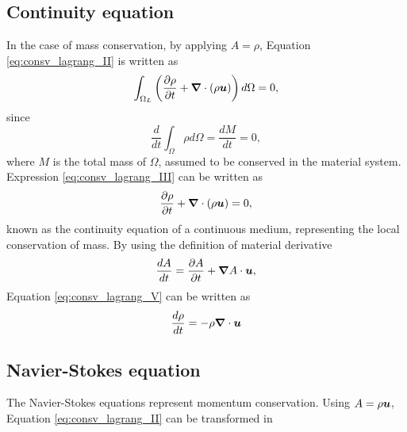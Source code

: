 \subsection{Continuity equation}
\label{subsec:continuity_eq}


In the case of mass conservation, by applying $A=\rho$, Equation \eqref{eq:consv_lagrang_II} is written as
%
	\begin{equation} \label{eq:consv_lagrang_III}
		\int_{\Omega_L} \left( \frac{\partial \rho}{\partial t} + \boldsymbol{\nabla}  \cdot(\rho \boldsymbol{u}) \right) d\Omega = 0,
	\end{equation}
%
since 
%
	\begin{equation} \label{eq:consv_lagrang_IV}
		\frac{d}{dt}\int_\Omega \rho d\Omega = \frac{dM}{dt} = 0,
	\end{equation}
%
where $M$ is the total mass of $\Omega$, assumed to be conserved in the material system. Expression \eqref{eq:consv_lagrang_III} can be written as 
%
	\begin{equation} \label{eq:consv_lagrang_V}
		\frac{\partial \rho}{\partial t} + \boldsymbol{\nabla}  \cdot(\rho \boldsymbol{u}) = 0,
	\end{equation}
%
known as the continuity equation of a continuous medium, representing the local conservation of mass. By using the definition of material derivative
%
	\begin{equation} \label{eq:euler_lagrange}
		\frac{dA}{d t}=\frac{\partial A}{\partial t} + \boldsymbol{\nabla}  A \cdot \boldsymbol{u},
	\end{equation}
%
Equation \eqref{eq:consv_lagrang_V} can be written as
%
	\begin{equation} \label{eq:navier_cont}
		\frac{d \rho}{d t} = - \rho\boldsymbol{\nabla} \cdot \boldsymbol{u}
	\end{equation}
%

\subsection{Navier-Stokes equation}
\label{subsec:navier_stokes}

The Navier-Stokes equations represent momentum conservation. Using $A=\rho \boldsymbol{u}$, Equation \eqref{eq:consv_lagrang_II} can be transformed in


